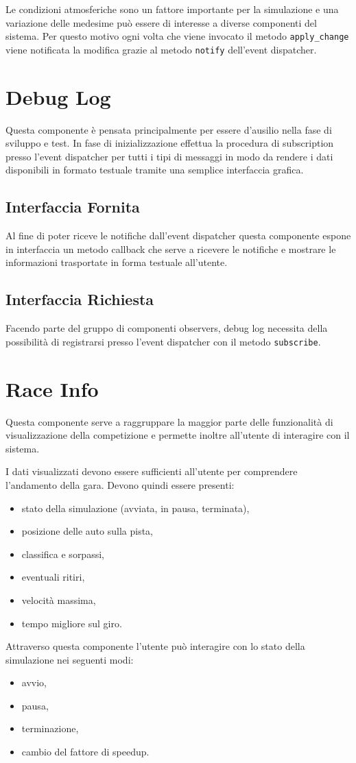 \documentclass[11pt,a4paper]{report}
\newcommand{\fun}[1]{\texttt{#1}}
\begin{document}
Le condizioni atmosferiche sono un fattore importante per la simulazione e una variazione delle medesime può essere di interesse a diverse componenti del sistema. Per questo motivo ogni volta che viene invocato il metodo \fun{apply\_change} viene notificata la modifica grazie al metodo \fun{notify} dell'event dispatcher.
\section{Debug Log}
Questa componente è pensata principalmente per essere d'ausilio nella fase di sviluppo e test. In fase di inizializzazione effettua la procedura di subscription presso l'event dispatcher per tutti i tipi di messaggi in modo da rendere i dati disponibili in formato testuale tramite una semplice interfaccia grafica.
\subsection*{Interfaccia Fornita}
Al fine di poter riceve le notifiche dall'event dispatcher questa componente espone in interfaccia un metodo callback che serve a ricevere le notifiche e mostrare le informazioni trasportate in forma testuale all'utente.
\subsection*{Interfaccia Richiesta}
Facendo parte del gruppo di componenti observers, debug log necessita della possibilità di registrarsi presso l'event dispatcher con il metodo \fun{subscribe}.
\section{Race Info}
Questa componente serve a raggruppare la maggior parte delle funzionalità di visualizzazione della competizione e permette inoltre all'utente di interagire con il sistema.

I dati visualizzati devono essere sufficienti all'utente per comprendere l'andamento della gara. Devono quindi essere presenti:
\begin{itemize}
\item stato della simulazione (avviata, in pausa, terminata),
\item posizione delle auto sulla pista,
\item classifica e sorpassi,
\item eventuali ritiri,
\item velocità massima,
\item tempo migliore sul giro.
\end{itemize}
Attraverso questa componente l'utente può interagire con lo stato della simulazione nei seguenti modi:
\begin{itemize}
\item avvio,
\item pausa,
\item terminazione,
\item cambio del fattore di speedup.
\end{itemize}
\end{document}
